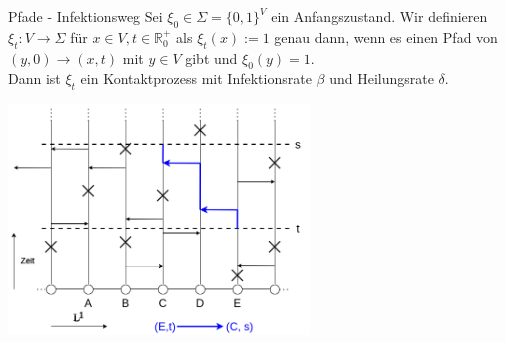 \documentclass[11pt]{beamer}
\begin{document}
\begin{frame}{Pfade - Infektionsweg}
    Sei $\xi_0 \in \Sigma = \{0, 1\}^V$ ein Anfangszustand. Wir definieren $\xi_t: V \to \Sigma$ für
    $x \in V, t \in \mathbb{R}^+_0$ als $\xi_t(x) := 1$ genau dann, wenn es
    einen Pfad von $(y, 0) \to (x, t)$ mit $y \in V$ gibt und $\xi_0(y) = 1$.
    \\
    Dann ist $\xi_t$ ein Kontaktprozess mit Infektionsrate $\beta$ und Heilungsrate $\delta$.
    \begin{center}
        \includegraphics[width=0.6\textwidth]{images/contact process path.png}
    \end{center}
\end{frame}
\end{document}
